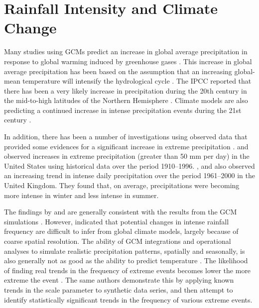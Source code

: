 \section{Rainfall Intensity and Climate Change}
\label{sec:RainfallIntensityAndClimateChange}

Many studies using GCMs predict an increase in global average precipitation in
response to global warming induced by greenhouse gases
\citep{houghton1996-climate,jones2001-1337,ipcc2001-881,ipcc2001-1032,
ipcc2007-impact,ipcc2007-physical}. This increase in global average
precipitation has been based on the assumption that an increasing global-mean
temperature will intensify the hydrological cycle
\citep{nearing2005-131}. The IPCC reported that there has been a very
likely increase in precipitation during the 20th century in the mid-to-high
latitudes of the Northern Hemisphere \citep{ipcc2001-881,ipcc2007-physical}.
Climate models are also predicting a continued increase in intense precipitation
events during the 21st century \citep{ipcc2001-1032,ipcc2007-impact}.

In addition, there has been a number of investigations using observed data
that provided some evidences for a significant increase in extreme precipitation
\citep{karl1995-217,karl1998-231,osborn2000-347,osborn2002-1313,
osborn2008-changing}. \citet{karl1995-217} and \citet{karl1998-231} observed
increases in extreme precipitation (greater than 50 mm per day) in the United
States using historical data over the period 1910--1996. \citet{osborn2000-347},
\citet{osborn2002-1313} and \citet{osborn2008-changing} also observed an
increasing trend in intense daily precipitation over the period 1961--2000 in
the United Kingdom. They found that, on average, precipitations were becoming
more intense in winter and less intense in summer.

The findings by \citet{osborn2000-347} and \citet{osborn2002-1313} are generally
consistent with the results from the GCM simulations
\citep{jones1997-265,jones2001-1337}. However,
\citet{ipcc2001-1032,ipcc2001-881} indicated that potential changes in intense
rainfall frequency are difficult to infer from global climate models, largely
because of coarse spatial resolution. The ability of GCM integrations and
operational analyses to simulate realistic precipitation patterns, spatially and
seasonally, is also generally not as good as the ability to predict temperature
\citep{mcguffie1999-1}. The likelihood of finding real trends in the frequency
of extreme events becomes lower the more extreme the event
\citep{frei2001-1568}. The same authors demonstrate this by applying known
trends in the scale parameter to synthetic data series, and then attempt to
identify statistically significant trends in the frequency of various extreme
events.

